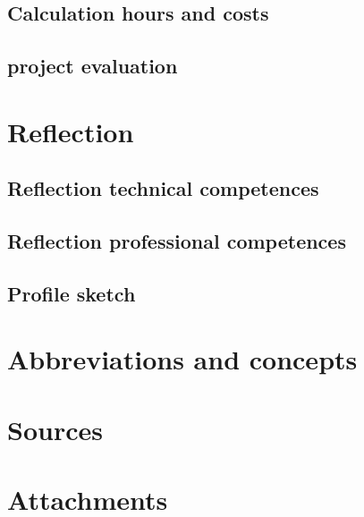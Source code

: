 \documentclass[10pt,a4paper]{report}
\begin{document}
\section{Calculation hours and costs}

\section{project evaluation}

\chapter{Reflection}
\section{Reflection technical competences}

\section{Reflection professional competences}

\section{Profile sketch}

\chapter{Abbreviations and concepts}

\chapter{Sources}

\chapter{Attachments}
\end{document}
